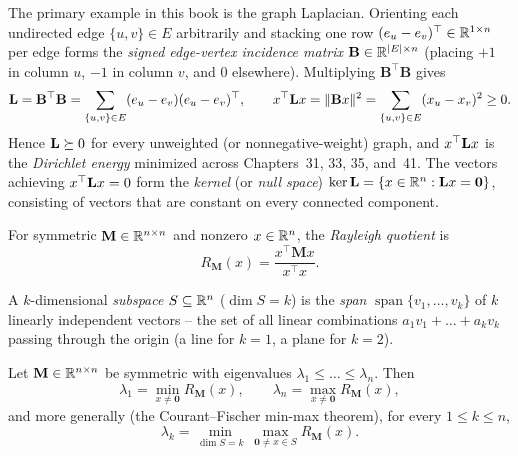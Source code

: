 The primary example in this book is the graph Laplacian. Orienting each undirected edge $\{u,v\} \in E$ arbitrarily and stacking one row $(e_u - e_v)^\top \in \mathbb{R}^{1\times n}$ per edge forms the \emph{signed edge-vertex incidence matrix} $\mathbf{B} \in \mathbb{R}^{\lvert E\rvert\times n}$ (placing $+1$ in column $u$, $-1$ in column $v$, and $0$ elsewhere). Multiplying $\mathbf{B}^\top\mathbf{B}$ gives
\[
  \mathbf{L} = \mathbf{B}^\top\mathbf{B} = \sum_{\{u,v\}\in E} (e_u - e_v)(e_u - e_v)^\top,
  \qquad
  x^\top \mathbf{L} x = \lVert\mathbf{B}x\rVert^2 = \sum_{\{u,v\}\in E} (x_u - x_v)^2 \ge 0.
\]
Hence $\mathbf{L} \succeq 0$ for every unweighted (or nonnegative-weight) graph, and $x^\top \mathbf{L} x$ is the \emph{Dirichlet energy} minimized across Chapters~31, 33, 35, and~41. The vectors achieving $x^\top\mathbf{L} x = 0$ form the \emph{kernel} (or \emph{null space}) $\ker\mathbf{L} = \{x \in \mathbb{R}^n : \mathbf{L} x = \mathbf{0}\}$, consisting of vectors that are constant on every connected component.

\begin{definition}
\label{ch42:def-rayleigh}
For symmetric $\mathbf{M} \in \mathbb{R}^{n\times n}$ and nonzero $x \in \mathbb{R}^n$, the \emph{Rayleigh quotient} is
\[
  R_{\mathbf{M}}(x) = \frac{x^\top\mathbf{M}x}{x^\top x}.
\]
\end{definition}

A $k$-dimensional \emph{subspace} $S \subseteq \mathbb{R}^n$ ($\dim S = k$) is the \emph{span} $\operatorname{span}\{v_1,\dots,v_k\}$ of $k$ linearly independent vectors -- the set of all linear combinations $a_1 v_1 + \dots + a_k v_k$ passing through the origin (a line for $k=1$, a plane for $k=2$).

\begin{theorem}
\label{ch42:thm-courant}
Let $\mathbf{M} \in \mathbb{R}^{n\times n}$ be symmetric with eigenvalues $\lambda_1 \le \dots \le \lambda_n$. Then
\[
  \lambda_1 = \min_{x \ne \mathbf{0}} R_{\mathbf{M}}(x), \qquad
  \lambda_n = \max_{x \ne \mathbf{0}} R_{\mathbf{M}}(x),
\]
and more generally (the Courant--Fischer min-max theorem), for every $1 \le k \le n$,
\[
  \lambda_k = \min_{\dim S = k}\ \max_{\mathbf{0} \ne x \in S} R_{\mathbf{M}}(x).
\]
\end{theorem}

